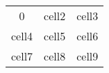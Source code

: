 \begin{center}
\begin{tabular}{ |c|c|c| } 
 \hline
 0 & cell2 & cell3 \\ 
 cell4 & cell5 & cell6 \\ 
 cell7 & cell8 & cell9 \\ 
 \hline
\end{tabular}
\end{center}